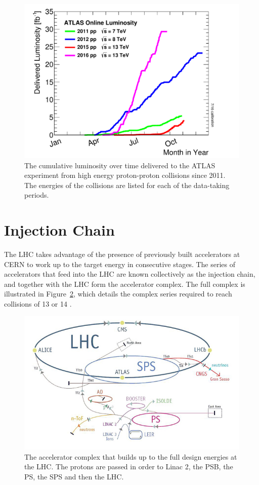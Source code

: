 \begin{figure}
\centering
\includegraphics[width=\fullfig]{figures/lumi_years.pdf}
\caption{The cumulative luminosity over time delivered to the \ac{ATLAS} experiment from high energy proton-proton collisions since 2011. The energies of the collisions are listed for each of the data-taking periods.}
\label{fig:lumi_years}
\end{figure}

\section{Injection Chain}
The \ac{LHC} takes advantage of the presence of previously built accelerators at \ac{CERN} to work up to the target energy in consecutive stages.
The series of accelerators that feed into the \ac{LHC} are known collectively as the injection chain, and together with the \ac{LHC} form the accelerator complex.
The full complex is illustrated in Figure~\ref{fig:accelerator_complex}, which details the complex series required to reach collisions of 13 or 14 \TeV. 

\begin{figure}[h]
\centering
\includegraphics[width=\fullfig]{figures/accelerator_complex.jpg}
\caption{The accelerator complex that builds up to the full design energies at the \ac{LHC}. The protons are passed in order to Linac 2, the \acs{PSB}, the \acs{PS}, the \acs{SPS} and then the \ac{LHC}.}
\label{fig:accelerator_complex}
\end{figure}

